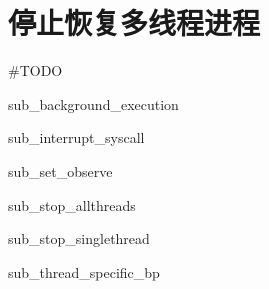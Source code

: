 \section{停止恢复多线程进程}

\#TODO

{sub_background_execution}

{sub_interrupt_syscall}

{sub_set_observe}

{sub_stop_allthreads}

{sub_stop_singlethread}

{sub_thread_specific_bp}
